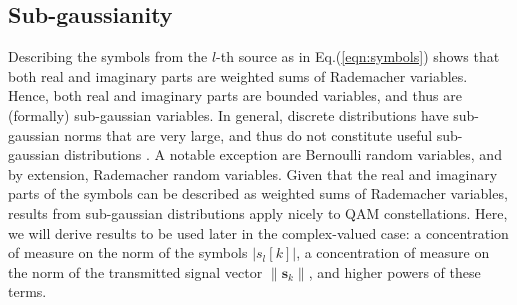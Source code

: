 
\subsection{Sub-gaussianity} \label{appdx:sub_caussianity}
Describing the symbols from the $l$-th source as in Eq.(\ref{eqn:symbols}) shows that both real and imaginary parts are weighted sums of Rademacher variables. Hence, both real and imaginary parts are bounded variables, and thus are (formally) sub-gaussian variables. In general, discrete distributions have sub-gaussian norms that are very large, and thus do not constitute useful sub-gaussian distributions \cite[Section 3.4]{Vershynin2018hdprobability}. A notable exception are Bernoulli random variables, and by extension, Rademacher random variables. Given that the real and imaginary parts of the symbols can be described as weighted sums of Rademacher variables, results from sub-gaussian distributions apply nicely to QAM constellations.
Here, we will derive results to be used later in the complex-valued case: a concentration of measure on the norm of the symbols $|s_l[k]|$, a concentration of measure on the norm of the transmitted signal vector $\|\bm{s}_k\|$, and higher powers of these terms.

